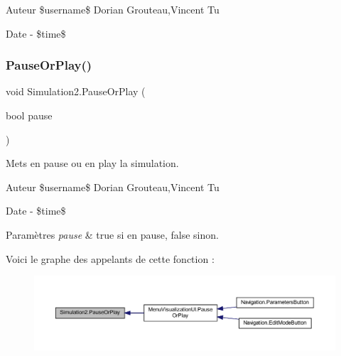 \begin{DoxyAuthor}{Auteur}
\$username\$ Dorian Grouteau,Vincent Tu 
\end{DoxyAuthor}
\begin{DoxyDate}{Date}
-\/ \$time\$ 
\end{DoxyDate}
\mbox{\label{class_simulation2_a2df629e8c95d93ca5955df4b3369f16f}} 
\subsubsection{\texorpdfstring{Pause\+Or\+Play()}{PauseOrPlay()}}
{\footnotesize\ttfamily void Simulation2.\+Pause\+Or\+Play (\begin{DoxyParamCaption}\item[{bool}]{pause }\end{DoxyParamCaption})\hspace{0.3cm}{\ttfamily [inline]}}



Mets en pause ou en play la simulation. 

\begin{DoxyAuthor}{Auteur}
\$username\$ Dorian Grouteau,Vincent Tu 
\end{DoxyAuthor}
\begin{DoxyDate}{Date}
-\/ \$time\$ 
\begin{DoxyParams}{Paramètres}
{\em pause} & true si en pause, false sinon.\\
\hline
\end{DoxyParams}

\end{DoxyDate}
Voici le graphe des appelants de cette fonction \+:
\nopagebreak
\begin{figure}[H]
\begin{center}
\leavevmode
\includegraphics[width=350pt]{class_simulation2_a2df629e8c95d93ca5955df4b3369f16f_icgraph}
\end{center}
\end{figure}
\mbox{\label{class_simulation2_addae6faec11353c1a1184c535cf3764c}} 
